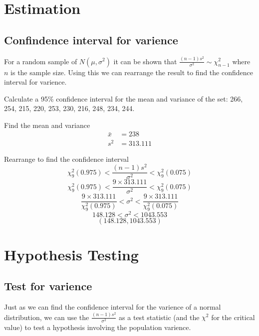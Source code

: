 \newpage
\section{Estimation}

    \newpage
    \subsection{Confindence interval for varience}
        For a random sample of $N(\mu, \sigma^2)$ it can be shown that $\displaystyle\frac{(n-1)s^2}{\sigma^2} \sim \chi^2_{n-1}$ where $n$ is the sample size. Using this we can rearrange the result to find the confidence interval for varience.

        \begin{example}
        {
            Calculate a 95\% confidence interval for the mean and variance of the set: 266, 254, 215, 220, 253, 230, 216, 248, 234, 244.
        }

        \begin{step}{Find the mean and variance}
        \begin{align*}
        \bar{x} &= 238 \\
        s^2 &= 313.111
        \end{align*}
        \end{step}

        \begin{step}{Rearrange to find the confidence interval}
        $$\chi^2_9(0.975) < \frac{(n-1)s^2}{\sigma^2} < \chi^2_9(0.075)$$
        $$\chi^2_9(0.975) < \frac{9 \times 313.111}{\sigma^2} < \chi^2_9(0.075)$$
        $$\frac{9 \times 313.111}{\chi^2_9(0.975)} < \sigma^2 < \frac{9 \times 313.111}{\chi^2_9(0.075)}$$
        $$148.128 < \sigma^2 < 1043.553$$
        $$(148.128, 1043.553)$$
        \end{step}

        \end{example}

\newpage
\section{Hypothesis Testing}

    \newpage
    \subsection{Test for varience}
        Just as we can find the confidence interval for the varience of a normal distribution, we can use the $\displaystyle\frac{(n-1)s^2}{\sigma^2}$ as a test statistic (and the $\chi^2$ for the critical value) to test a hypothesis involving the population varience.

